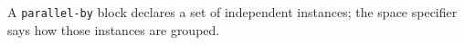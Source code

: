 A \texttt{parallel-by} block declares a set of independent instances; the space specifier says how those instances are grouped.
